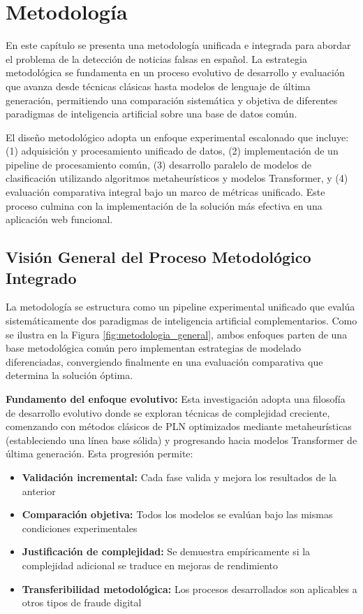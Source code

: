 \chapter{Metodología \label{cap:Metodologia}}

En este capítulo se presenta una metodología unificada e integrada para abordar el problema de la detección de noticias falsas en español. La estrategia metodológica se fundamenta en un proceso evolutivo de desarrollo y evaluación que avanza desde técnicas clásicas hasta modelos de lenguaje de última generación, permitiendo una comparación sistemática y objetiva de diferentes paradigmas de inteligencia artificial sobre una base de datos común.

El diseño metodológico adopta un enfoque experimental escalonado que incluye: (1) adquisición y procesamiento unificado de datos, (2) implementación de un pipeline de procesamiento común, (3) desarrollo paralelo de modelos de clasificación utilizando algoritmos metaheurísticos y modelos Transformer, y (4) evaluación comparativa integral bajo un marco de métricas unificado. Este proceso culmina con la implementación de la solución más efectiva en una aplicación web funcional.

\section{Visión General del Proceso Metodológico Integrado}

La metodología se estructura como un pipeline experimental unificado que evalúa sistemáticamente dos paradigmas de inteligencia artificial complementarios. Como se ilustra en la Figura \ref{fig:metodologia_general}, ambos enfoques parten de una base metodológica común pero implementan estrategias de modelado diferenciadas, convergiendo finalmente en una evaluación comparativa que determina la solución óptima.

\textbf{Fundamento del enfoque evolutivo:} Esta investigación adopta una filosofía de desarrollo evolutivo donde se exploran técnicas de complejidad creciente, comenzando con métodos clásicos de PLN optimizados mediante metaheurísticas (estableciendo una línea base sólida) y progresando hacia modelos Transformer de última generación. Esta progresión permite:

\begin{itemize}
    \item \textbf{Validación incremental:} Cada fase valida y mejora los resultados de la anterior
    \item \textbf{Comparación objetiva:} Todos los modelos se evalúan bajo las mismas condiciones experimentales
    \item \textbf{Justificación de complejidad:} Se demuestra empíricamente si la complejidad adicional se traduce en mejoras de rendimiento
    \item \textbf{Transferibilidad metodológica:} Los procesos desarrollados son aplicables a otros tipos de fraude digital
\end{itemize}

